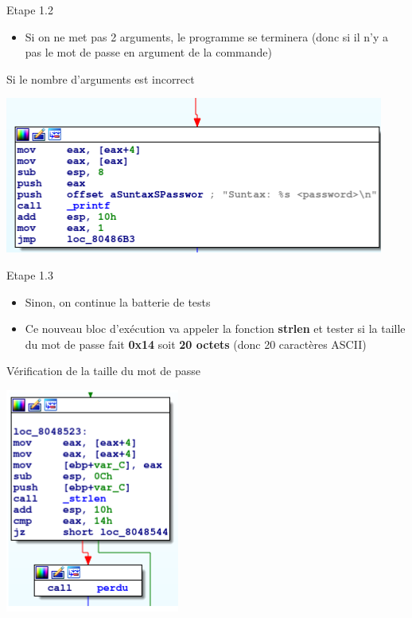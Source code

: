 \documentclass{beamer}
\begin{document}
	\begin{frame}
	\begin{block}{Etape 1.2}
		\begin{itemize}
			\item Si on ne met pas 2 arguments, le programme se terminera (donc si il n'y a pas le mot de passe en argument de la commande)
		\end{itemize}
	\end{block}
	\begin{exampleblock}{Si le nombre d'arguments est incorrect}
		\begin{center}
			\includegraphics[scale=0.45]{./pictures/114-reversing-3-2.PNG}
		\end{center}
	\end{exampleblock}
	\end{frame}

	\begin{frame}
		\begin{block}{Etape 1.3}
		\begin{itemize}
		\item Sinon, on continue la batterie de tests
		\item Ce nouveau bloc d'exécution va appeler la fonction \textbf{strlen} et tester si la taille du mot de passe fait \textbf{0x14} soit \textbf{20 octets} (donc 20 caractères ASCII)
		\end{itemize}
		\end{block}
		\begin{exampleblock}{Vérification de la taille du mot de passe}
		\begin{center}
			\includegraphics[scale=0.45]{./pictures/114-reversing-3-3.PNG}
		\end{center}
		\end{exampleblock}
	\end{frame}
\end{document}

